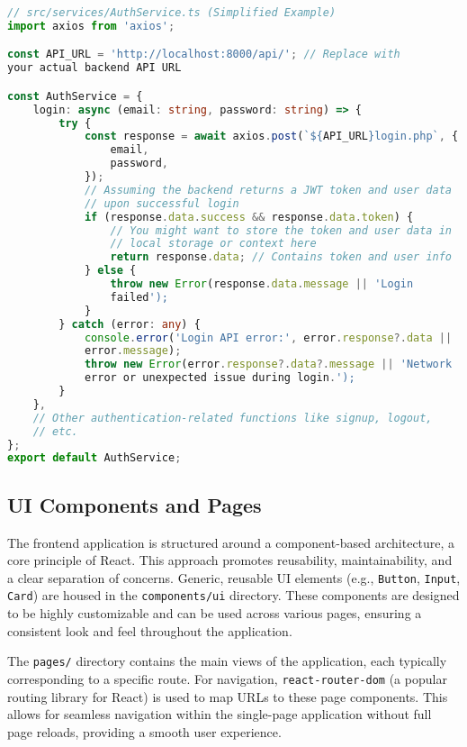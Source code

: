 \documentclass{report}
\begin{document}
\begin{lstlisting}[caption={Code Snippet 4.4: Simplified \texttt{login} function from \texttt{AuthService.ts}, demonstrating frontend communication with the backend API.},label={lst:authservice_login},language=TypeScript]
// src/services/AuthService.ts (Simplified Example)
import axios from 'axios';

const API_URL = 'http://localhost:8000/api/'; // Replace with
your actual backend API URL

const AuthService = {
    login: async (email: string, password: string) => {
        try {
            const response = await axios.post(`${API_URL}login.php`, {
                email,
                password,
            });
            // Assuming the backend returns a JWT token and user data
            // upon successful login
            if (response.data.success && response.data.token) {
                // You might want to store the token and user data in
                // local storage or context here
                return response.data; // Contains token and user info
            } else {
                throw new Error(response.data.message || 'Login
                failed');
            }
        } catch (error: any) {
            console.error('Login API error:', error.response?.data ||
            error.message);
            throw new Error(error.response?.data?.message || 'Network
            error or unexpected issue during login.');
        }
    },
    // Other authentication-related functions like signup, logout,
    // etc.
};
export default AuthService;
\end{lstlisting}

\subsection{UI Components and Pages}
\label{sec:ui_components_pages}
The frontend application is structured around a component-based architecture, a core principle of React. This approach promotes reusability, maintainability, and a clear separation of concerns. Generic, reusable UI elements (e.g., \texttt{Button}, \texttt{Input}, \texttt{Card}) are housed in the \texttt{components/ui} directory. These components are designed to be highly customizable and can be used across various pages, ensuring a consistent look and feel throughout the application.

The \texttt{pages/} directory contains the main views of the application, each typically corresponding to a specific route. For navigation, \texttt{react-router-dom} (a popular routing library for React) is used to map URLs to these page components. This allows for seamless navigation within the single-page application without full page reloads, providing a smooth user experience.
\end{document}
